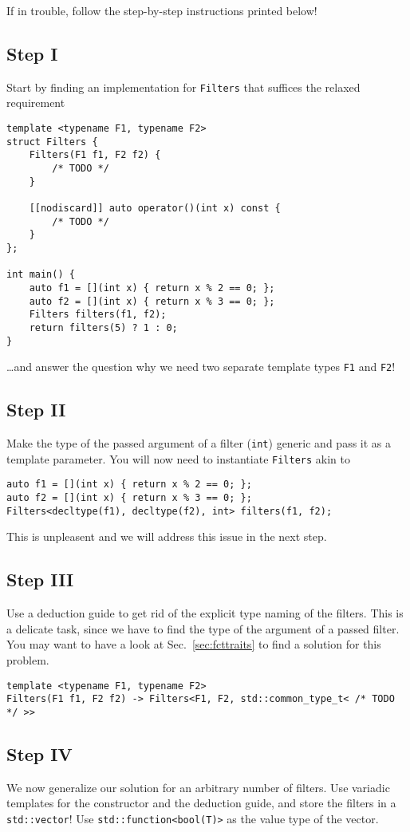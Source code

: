 \documentclass{scrartcl}
\begin{document}
If in trouble, follow the step-by-step instructions printed below!

\subsection{Step I}
Start by finding an implementation for \texttt{Filters} that suffices the relaxed requirement
\begin{lstlisting}
template <typename F1, typename F2>
struct Filters {
    Filters(F1 f1, F2 f2) {
        /* TODO */
    }

    [[nodiscard]] auto operator()(int x) const {
        /* TODO */
    }
};

int main() {
    auto f1 = [](int x) { return x % 2 == 0; };
    auto f2 = [](int x) { return x % 3 == 0; };
    Filters filters(f1, f2);
    return filters(5) ? 1 : 0;
}
\end{lstlisting}
\ldots and answer the question why we need two separate template types \texttt{F1} and \texttt{F2}!

\subsection{Step II}
Make the type of the passed argument of a filter (\texttt{int}) generic and pass it as a template parameter. You will now need to instantiate \texttt{Filters} akin to
\begin{lstlisting}
auto f1 = [](int x) { return x % 2 == 0; };
auto f2 = [](int x) { return x % 3 == 0; };
Filters<decltype(f1), decltype(f2), int> filters(f1, f2);
\end{lstlisting}
This is unpleasent and we will address this issue in the next step.

\subsection{Step III}
Use a deduction guide to get rid of the explicit type naming of the filters. This is a delicate task, since we have to find the type of the argument of a passed filter. You may want to have a look at Sec.~\ref{sec:fcttraits} to find a solution for this problem.
\begin{lstlisting}
template <typename F1, typename F2>
Filters(F1 f1, F2 f2) -> Filters<F1, F2, std::common_type_t< /* TODO */ >>
\end{lstlisting}

\subsection{Step IV}
We now generalize our solution for an arbitrary number of filters. Use variadic templates for the constructor and the deduction guide, and store the filters in a \texttt{std::vector}! Use \texttt{std::function<bool(T)>} as the value type of the vector.
\end{document}
